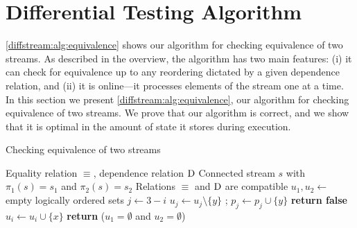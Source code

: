 \section{Differential Testing Algorithm}
\label{diffstream:sec:algorithm}

\cref{diffstream:alg:equivalence} shows our algorithm for checking equivalence of two streams.
As described in the overview, the algorithm has two main features:
(i) it can check for equivalence up to any reordering dictated by a given dependence relation, and
(ii) it is online---it processes elements of the stream one at a time.
In this section we present \cref{diffstream:alg:equivalence}, our algorithm for checking equivalence of two streams.
We prove that our algorithm is correct, and we show that it is optimal in the amount of state it stores during execution.

\begin{algorithm}[t]
  \renewcommand{\thealgorithm}{DiffStream}
  \caption{Checking equivalence of two streams}
  \label{diffstream:alg:equivalence}
  \begin{algorithmic}[1]
    \Require Equality relation $\equiv$, dependence relation $\mathrel{\mathrm{D}}$
    \Require Connected stream $s$ with $\pi_1(s)=s_1$ and $\pi_2(s)=s_2$
    \renewcommand{\algorithmicrequire}{\textbf{Require:}}
    \Require Relations $\equiv$ and $\mathrel{\mathrm{D}}$ are compatible
    \label{diffstream:line:StreamsEquivalentBegin}
    \State $u_1, u_2 \gets$ empty logically ordered sets
    \label{diffstream:line:ProcessElementBegin}
      \State $j \gets 3-i$
      \label{diffstream:line:MatchBegin}
        \State $u_j \gets u_j \setminus \{y\}$
        ;
        {\color{gray}$p_j \gets p_j \cup \{y\}$}\label{diffstream:line:GhostBegin}
        \label{diffstream:line:MatchEnd}
      \label{diffstream:line:NotEquivalentBegin}
        \State \textbf{return false}\label{diffstream:line:NotEquivalentEnd}
      \Else\label{diffstream:line:UnmatchedBegin}
        \State $u_i \gets u_i \cup \{x\}$\label{diffstream:line:UnmatchedEnd}
      \EndIf\label{diffstream:line:ProcessElementEnd}
    \EndFor
    \State \textbf{return} ($u_1=\emptyset$ and $u_2=\emptyset$)
    \label{diffstream:line:FiniteEquivalent}
    \EndFunction\label{diffstream:line:StreamsEquivalentEnd}
  \end{algorithmic}
\end{algorithm}


